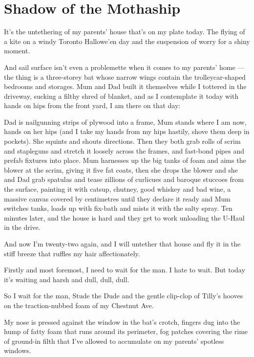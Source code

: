 \section{Shadow of the Mothaship}

It's the untethering of my parents' house that's on my plate today.
The flying of a kite on a windy Toronto Hallowe'en day and the
suspension of worry for a shiny moment.

And sail surface isn't even a problemette when it comes to my
parents' home --- the thing is a three-storey bat whose narrow
wings contain the trolleycar-shaped bedrooms and storages. Mum and
Dad built it themselves while I tottered in the driveway, sucking a
filthy shred of blanket, and as I contemplate it today with hands
on hips from the front yard, I am there on that day:

Dad is nailgunning strips of plywood into a frame, Mum stands where
I am now, hands on her hips (and I take my hands from my hips
hastily, shove them deep in pockets). She squints and shouts
directions. Then they both grab rolls of scrim and stapleguns and
stretch it loosely across the frames, and fast-bond pipes and
prefab fixtures into place. Mum harnesses up the big tanks of foam
and aims the blower at the scrim, giving it five fat coats, then
she drops the blower and she and Dad grab spatulas and tease
zillions of curlicues and baroque stuccoes from the surface,
painting it with catsup, chutney, good whiskey and bad wine, a
massive canvas covered by centimetres until they declare it ready
and Mum switches tanks, loads up with fix-bath and mists it with
the salty spray. Ten minutes later, and the house is hard and they
get to work unloading the U-Haul in the drive.

And now I'm twenty-two again, and I will untether that house and
fly it in the stiff breeze that ruffles my hair affectionately.

\tb

Firstly and most foremost, I need to wait for the man. I hate to
wait. But today it's waiting and harsh and dull, dull, dull.

So I wait for the man, Stude the Dude and the gentle clip-clop of
Tilly's hooves on the traction-nubbed foam of my Chestnut Ave.

My nose is pressed against the window in the bat's crotch, fingers
dug into the hump of fatty foam that runs around its perimeter, fog
patches covering the rime of ground-in filth that I've allowed to
accumulate on my parents' spotless windows.

